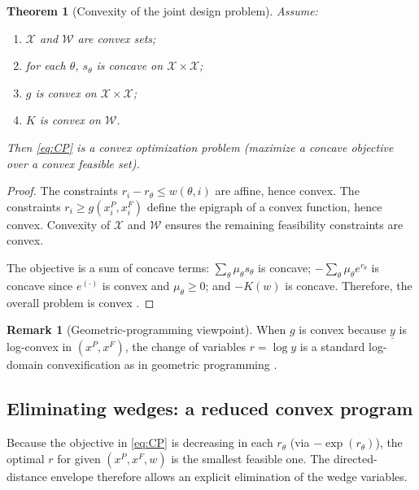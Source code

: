 \documentclass[final,3p,times]{elsarticle}
\theoremstyle{plain}
\newtheorem{theorem}{Theorem}
\theoremstyle{definition}
\newtheorem{remark}{Remark}
\newcommand{\1}{\mathbbm{1}}
\newcommand{\cX}{\mathcal{X}}
\newcommand{\cW}{\mathcal{W}}
\begin{document}
\begin{theorem}[Convexity of the joint design problem]\label{thm:convex}
Assume:
\begin{enumerate}[label=(\roman*)]
\item $\cX$ and $\cW$ are convex sets;
\item for each $\theta$, $s_\theta$ is concave on $\cX\times\cX$;
\item $g$ is convex on $\cX\times\cX$;
\item $K$ is convex on $\cW$.
\end{enumerate}
Then \eqref{eq:CP} is a convex optimization problem (maximize a concave objective over a convex feasible set).
\end{theorem}

\begin{proof}
The constraints $r_i-r_\theta\le w(\theta,i)$ are affine, hence convex. The constraints $r_i\ge g(x_i^P,x_i^F)$ define the epigraph of a convex function, hence convex. Convexity of $\cX$ and $\cW$ ensures the remaining feasibility constraints are convex.

The objective is a sum of concave terms: $\sum_\theta \mu_\theta s_\theta$ is concave; $-\sum_\theta \mu_\theta e^{r_\theta}$ is concave since $e^{(\cdot)}$ is convex and $\mu_\theta\ge 0$; and $-K(w)$ is concave. Therefore, the overall problem is convex \citep{BoydVandenberghe2004}.
\end{proof}

\begin{remark}[Geometric-programming viewpoint]
When $g$ is convex because $\underline y$ is log-convex in $(x^P,x^F)$, the change of variables $r=\log y$ is a standard log-domain convexification as in geometric programming \citep{BoydKimVandenbergheHassibi2007}. 
\end{remark}

\subsection{Eliminating wedges: a reduced convex program}\label{sec:reduce}

Because the objective in \eqref{eq:CP} is decreasing in each $r_\theta$ (via $-\exp(r_\theta)$), the optimal
$r$ for given $(x^P,x^F,w)$ is the smallest feasible one. The directed-distance envelope therefore allows
an explicit elimination of the wedge variables.
\end{document}
